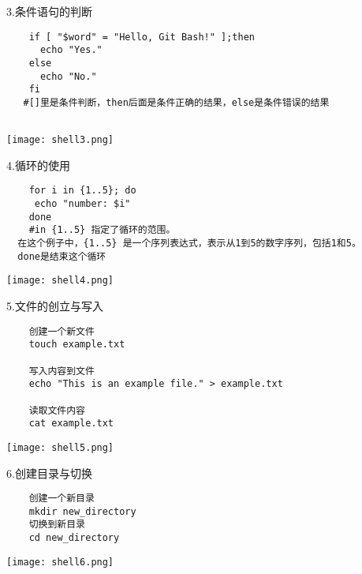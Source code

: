 \documentclass{article}
\begin{document}
3.条件语句的判断
 \begin{verbatim}
    if [ "$word" = "Hello, Git Bash!" ];then
      echo "Yes."
    else
      echo "No."
    fi
   #[]里是条件判断，then后面是条件正确的结果，else是条件错误的结果
   
 \end{verbatim}

\noindent
\begin{minipage}{\linewidth}
  \centering
  \texttt{[image: shell3.png]}
  \label{fig:example}
\end{minipage}

4.循环的使用
\begin{verbatim}
    for i in {1..5}; do
     echo "number: $i"
    done
    #in {1..5} 指定了循环的范围。
  在这个例子中，{1..5} 是一个序列表达式，表示从1到5的数字序列，包括1和5。
  done是结束这个循环
\end{verbatim}

\noindent
\begin{minipage}{\linewidth}
 \centering
  \texttt{[image: shell4.png]}
  \label{fig:example}
\end{minipage}



5.文件的创立与写入
\begin{verbatim}
    创建一个新文件
    touch example.txt
    
    写入内容到文件
    echo "This is an example file." > example.txt
    
    读取文件内容
    cat example.txt     
\end{verbatim}


\noindent
\begin{minipage}{\linewidth}
 \centering
  \texttt{[image: shell5.png]}
  \label{fig:example}
\end{minipage}

6.创建目录与切换
\begin{verbatim}
    创建一个新目录
    mkdir new_directory
    切换到新目录
    cd new_directory
\end{verbatim}



\noindent
\begin{minipage}{\linewidth}
 \centering
  \texttt{[image: shell6.png]}
  \label{fig:example}
\end{minipage}
\end{document}
